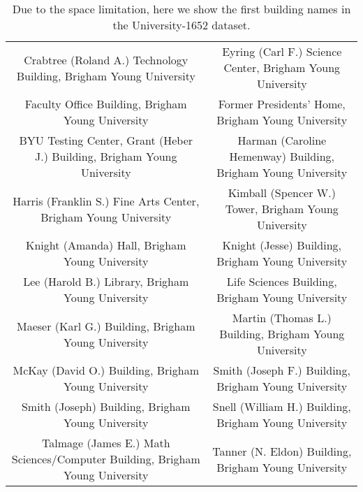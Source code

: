 \documentclass[sigconf]{acmart}
\begin{document}
\begin{table*}
\begin{center}
\begin{tabular}{c|c}
Crabtree (Roland A.) Technology Building, Brigham Young University & Eyring (Carl F.) Science Center, Brigham Young University\\
Faculty Office Building, Brigham Young University & Former Presidents' Home, Brigham Young University\\
BYU Testing Center, Grant (Heber J.) Building, Brigham Young University & Harman (Caroline Hemenway) Building, Brigham Young University\\
Harris (Franklin S.) Fine Arts Center, Brigham Young University & Kimball (Spencer W.) Tower, Brigham Young University\\
Knight (Amanda) Hall, Brigham Young University & Knight (Jesse) Building, Brigham Young University\\
Lee (Harold B.) Library, Brigham Young University & Life Sciences Building, Brigham Young University\\
Maeser (Karl G.) Building, Brigham Young University & Martin (Thomas L.) Building, Brigham Young University\\
McKay (David O.) Building, Brigham Young University & Smith (Joseph F.) Building, Brigham Young University\\
Smith (Joseph) Building, Brigham Young University & Snell (William H.) Building, Brigham Young University\\
Talmage (James E.) Math Sciences/Computer Building, Brigham Young University & Tanner (N. Eldon) Building, Brigham Young University\\
\hline
\end{tabular}
\end{center}
\caption{Due to the space limitation, here we show the first  building names in the University-1652 dataset.
}
\label{table:BuildingName}
\end{table*} 
\end{document}
